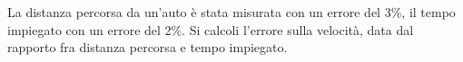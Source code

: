 La distanza percorsa da un'auto è stata misurata con un 
errore del 3\%, il tempo impiegato con un errore del 2\%. 
Si calcoli l'errore sulla velocità, data dal rapporto fra 
distanza percorsa e tempo impiegato.